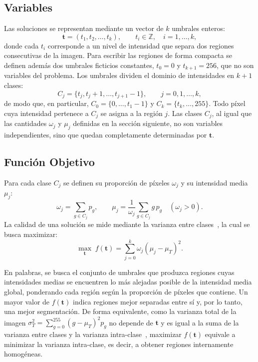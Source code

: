 \documentclass[letter, 10pt]{article}
\begin{document}
\subsection{Variables}
Las soluciones se representan mediante un vector de $k$ umbrales enteros:
\begin{equation}
    \mathbf{t} = (t_1, t_2, \dots, t_k), \qquad t_i \in \mathbb{Z}, \quad i = 1, \dots, k,
\end{equation}
donde cada $t_i$ corresponde a un nivel de intensidad que separa dos regiones consecutivas de la imagen. Para escribir las regiones de forma compacta se definen adem\'as dos umbrales ficticios constantes, $t_0 = 0$ y $t_{k+1} = 256$, que no son variables del problema. Los umbrales dividen el dominio de intensidades en $k+1$ clases:
\begin{equation}
    C_j = \{t_j, t_j + 1, \dots, t_{j+1} - 1\}, \qquad j = 0, 1, \dots, k,
\end{equation}
de modo que, en particular, $C_0 = \{0, \dots, t_1 - 1\}$ y $C_k = \{t_k, \dots, 255\}$. Todo p\'ixel cuya intensidad pertenece a $C_j$ se asigna a la regi\'on $j$. Las clases $C_j$, al igual que las cantidades $\omega_j$ y $\mu_j$ definidas en la secci\'on siguiente, no son variables independientes, sino que quedan completamente determinadas por $\mathbf{t}$.

\subsection{Funci\'on Objetivo}
Para cada clase $C_j$ se definen su proporci\'on de p\'ixeles $\omega_j$ y su intensidad media $\mu_j$:
\begin{equation}
    \omega_j = \sum_{g \in C_j} p_g, \qquad
    \mu_j = \frac{1}{\omega_j} \sum_{g \in C_j} g\, p_g \quad (\omega_j > 0).
\end{equation}
La calidad de una soluci\'on se mide mediante la varianza entre clases~\cite{Otsu1979}, la cual se busca maximizar:
\begin{equation}
    \max_{\mathbf{t}} \; f(\mathbf{t}) = \sum_{j=0}^{k} \omega_j \left( \mu_j - \mu_T \right)^2 .
    \label{eq:otsu}
\end{equation}

En palabras, se busca el conjunto de umbrales que produzca regiones cuyas intensidades medias se encuentren lo m\'as alejadas posible de la intensidad media global, ponderando cada regi\'on seg\'un la proporci\'on de p\'ixeles que contiene. Un mayor valor de $f(\mathbf{t})$ indica regiones mejor separadas entre s\'i y, por lo tanto, una mejor segmentaci\'on. De forma equivalente, como la varianza total de la imagen $\sigma_T^2 = \sum_{g=0}^{255} (g - \mu_T)^2 p_g$ no depende de $\mathbf{t}$ y es igual a la suma de la varianza entre clases y la varianza intra-clase~\cite{Otsu1979}, maximizar $f(\mathbf{t})$ equivale a minimizar la varianza intra-clase, es decir, a obtener regiones internamente homog\'eneas.
\end{document}
